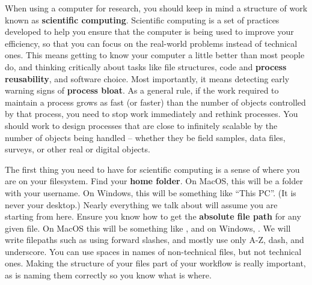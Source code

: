When using a computer for research,
you should keep in mind a structure of work
known as \textbf{scientific computing}.\cite{wilson2014best,wilson2017good}
Scientific computing is a set of practices developed to help you
ensure that the computer is being used to improve your efficiency,
so that you can focus on the real-world problems instead of technical ones.
This means getting to know your computer a little better than most people do,
and thinking critically about tasks like file structures,
code and \textbf{process reusability},
and software choice. Most importantly,
it means detecting early warning signs of \textbf{process bloat}.
As a general rule, if the work required to maintain a process
grows as fast (or faster) than the number of objects controlled by that process,
you need to stop work immediately and rethink processes.
You should work to design processes that are
close to infinitely scalable by the number of objects being handled --
whether they be field samples, data files, surveys, or other real or digital objects.

The first thing you need to have for scientific computing
is a sense of where you are on your filesystem.
Find your \textbf{home folder}. On MacOS, this will be a folder with your username.
On Windows, this will be something like ``This PC''. (It is never your desktop.)
Nearly everything we talk about will assume you are starting from here.
Ensure you know how to get the \textbf{absolute file path} for any given file.
On MacOS this will be something like ,
and on Windows, .
We will write filepaths such as 
using forward slashes, and mostly use only A-Z, dash, and underscore.
You can use spaces in names of non-technical files, but not technical ones.
Making the structure of your files part of your workflow is really important,
as is naming them correctly so you know what is where.

